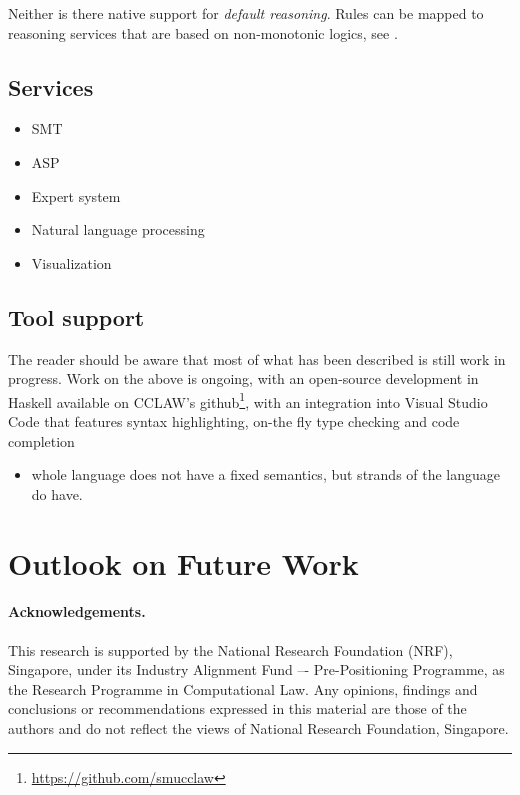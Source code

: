 \documentclass[runningheads]{llncs}
\begin{document}
Neither is there native support for \emph{default reasoning}. Rules can be
mapped to reasoning services that are based on non-monotonic logics, see
. 

\subsection{Services}\label{sec:services}

\begin{itemize}
\item SMT
\item ASP
\item Expert system
\item Natural language processing
\item Visualization
\end{itemize}

\subsection{Tool support}\label{sec:tool_support}


The reader should be aware that most of what has been described is still work
in progress. Work on the above is ongoing, with an open-source development in
Haskell available on CCLAW's
github\footnote{\url{https://github.com/smucclaw}}, with an integration into
Visual Studio Code that features syntax highlighting, on-the fly type checking
and code completion 

\begin{itemize}
\item whole language does not have a fixed semantics, but strands of the
  language do have.
\end{itemize}

\section{Outlook on Future Work}\label{sec:outlook}



\paragraph{Acknowledgements.}
This research is supported by the National Research Foundation (NRF),
Singapore, under its Industry Alignment Fund –- Pre-Positioning Programme, as
the Research Programme in Computational Law. Any opinions, findings and
conclusions or recommendations expressed in this material are those of the
authors and do not reflect the views of National Research Foundation,
Singapore.

% 
% 


\end{document}
